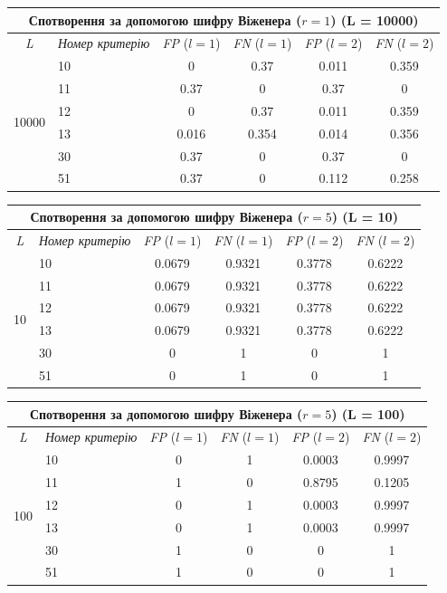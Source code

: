 \documentclass[a4paper,12pt]{article}
\begin{document}
\begin{center}
\renewcommand{\arraystretch}{1.2}
\setlength{\tabcolsep}{6pt}
\begin{tabular}{|c|l||c|c||c|c|}
\hline
\multicolumn{6}{|c|}{Спотворення за допомогою шифру Віженера ($r = 1$) (L = 10000)} \\
\hline
\textit{L} & \textit{Номер критерію} & \textit{FP} ($l=1$) & \textit{FN} ($l=1$) & \textit{FP} ($l=2$) & \textit{FN} ($l=2$) \\
\hline
\multirow{6}{*}{10000} & 10 & 0 & 0.37 & 0.011 & 0.359 \\
 & 11 & 0.37 & 0 & 0.37 & 0 \\
 & 12 & 0 & 0.37 & 0.011 & 0.359 \\
 & 13 & 0.016 & 0.354 & 0.014 & 0.356 \\
 & 30 & 0.37 & 0 & 0.37 & 0 \\
 & 51 & 0.37 & 0 & 0.112 & 0.258 \\
\hline
\end{tabular}
\end{center}

\begin{center}
\renewcommand{\arraystretch}{1.2}
\setlength{\tabcolsep}{6pt}
\begin{tabular}{|c|l||c|c||c|c|}
\hline
\multicolumn{6}{|c|}{Спотворення за допомогою шифру Віженера ($r = 5$) (L = 10)} \\
\hline
\textit{L} & \textit{Номер критерію} & \textit{FP} ($l=1$) & \textit{FN} ($l=1$) & \textit{FP} ($l=2$) & \textit{FN} ($l=2$) \\
\hline
\multirow{6}{*}{10} & 10 & 0.0679 & 0.9321 & 0.3778 & 0.6222 \\
 & 11 & 0.0679 & 0.9321 & 0.3778 & 0.6222 \\
 & 12 & 0.0679 & 0.9321 & 0.3778 & 0.6222 \\
 & 13 & 0.0679 & 0.9321 & 0.3778 & 0.6222 \\
 & 30 & 0 & 1 & 0 & 1 \\
 & 51 & 0 & 1 & 0 & 1 \\
\hline
\end{tabular}
\end{center}

\begin{center}
\renewcommand{\arraystretch}{1.2}
\setlength{\tabcolsep}{6pt}
\begin{tabular}{|c|l||c|c||c|c|}
\hline
\multicolumn{6}{|c|}{Спотворення за допомогою шифру Віженера ($r = 5$) (L = 100)} \\
\hline
\textit{L} & \textit{Номер критерію} & \textit{FP} ($l=1$) & \textit{FN} ($l=1$) & \textit{FP} ($l=2$) & \textit{FN} ($l=2$) \\
\hline
\multirow{6}{*}{100} & 10 & 0 & 1 & 0.0003 & 0.9997 \\
 & 11 & 1 & 0 & 0.8795 & 0.1205 \\
 & 12 & 0 & 1 & 0.0003 & 0.9997 \\
 & 13 & 0 & 1 & 0.0003 & 0.9997 \\
 & 30 & 1 & 0 & 0 & 1 \\
 & 51 & 1 & 0 & 0 & 1 \\
\hline
\end{tabular}
\end{center}
\end{document}
